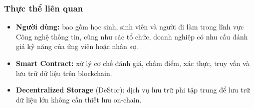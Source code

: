 \documentclass{article}[14pt]
\begin{document}
{  \subsubsection{Thực thể liên quan}
  \begin{itemize}
      \item \textbf{Người dùng:} bao gồm học sinh, sinh viên và người đi làm trong lĩnh vực Công nghệ thông tin, cũng như các tổ chức, doanh nghiệp có nhu cầu đánh giá kỹ năng của ứng viên hoặc nhân sự.
      \item \textbf{Smart Contract:} xử lý cơ chế đánh giá, chấm điểm, xác thực, truy vấn và lưu trữ dữ liệu trên blockchain.
      \item \textbf{Decentralized Storage} (DeStor): dịch vụ lưu trữ phi tập trung để lưu trữ dữ liệu lớn không cần thiết lưu on-chain.
  \end{itemize}

}
\end{document}
